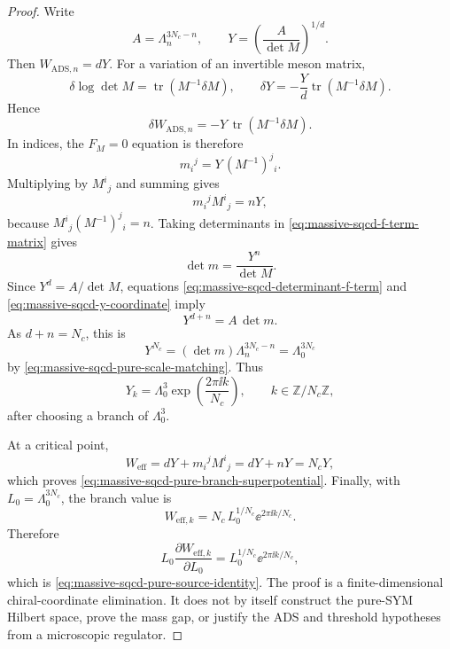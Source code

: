 \begin{proof}
Write
\begin{equation}
  A=\Lambda_n^{3N_c-n},
  \qquad
  Y=\left(\frac{A}{\det M}\right)^{1/d}.
  \label{eq:massive-sqcd-y-coordinate}
\end{equation}
Then \(W_{\mathrm{ADS},n}=dY\).  For a variation of an invertible meson
matrix,
\[
  \delta\log\det M=\operatorname{tr}(M^{-1}\delta M),
  \qquad
  \delta Y
  =
  -\frac{Y}{d}\operatorname{tr}(M^{-1}\delta M).
\]
Hence
\[
  \delta W_{\mathrm{ADS},n}
  =
  -Y\,\operatorname{tr}(M^{-1}\delta M).
\]
In indices, the \(F_M=0\) equation is therefore
\begin{equation}
  m_i{}^j=Y\,(M^{-1})^j{}_i .
  \label{eq:massive-sqcd-f-term-matrix}
\end{equation}
Multiplying by \(M^i{}_j\) and summing gives
\begin{equation}
  m_i{}^jM^i{}_j=nY,
  \label{eq:massive-sqcd-trace-mass-meson}
\end{equation}
because \(M^i{}_j(M^{-1})^j{}_i=n\).  Taking determinants in
\eqref{eq:massive-sqcd-f-term-matrix} gives
\begin{equation}
  \det m=\frac{Y^n}{\det M}.
  \label{eq:massive-sqcd-determinant-f-term}
\end{equation}
Since \(Y^d=A/\det M\), equations
\eqref{eq:massive-sqcd-determinant-f-term} and
\eqref{eq:massive-sqcd-y-coordinate} imply
\[
  Y^{d+n}=A\,\det m.
\]
As \(d+n=N_c\), this is
\[
  Y^{N_c}
  =
  (\det m)\Lambda_n^{3N_c-n}
  =
  \Lambda_0^{3N_c}
\]
by \eqref{eq:massive-sqcd-pure-scale-matching}.  Thus
\[
  Y_k=\Lambda_0^3\exp\!\left(\frac{2\pi\ii k}{N_c}\right),
  \qquad k\in\mathbb Z/N_c\mathbb Z,
\]
after choosing a branch of \(\Lambda_0^3\).

At a critical point,
\[
  W_{\mathrm{eff}}
  =
  dY+m_i{}^jM^i{}_j
  =
  dY+nY
  =
  N_cY,
\]
which proves \eqref{eq:massive-sqcd-pure-branch-superpotential}.  Finally,
with \(L_0=\Lambda_0^{3N_c}\), the branch value is
\[
  W_{\mathrm{eff},k}=N_c\,L_0^{1/N_c}\ee^{2\pi\ii k/N_c}.
\]
Therefore
\[
  L_0\frac{\partial W_{\mathrm{eff},k}}{\partial L_0}
  =
  L_0^{1/N_c}\ee^{2\pi\ii k/N_c},
\]
which is \eqref{eq:massive-sqcd-pure-source-identity}.  The proof is a
finite-dimensional chiral-coordinate elimination.  It does not by itself
construct the pure-SYM Hilbert space, prove the mass gap, or justify the ADS
and threshold hypotheses from a microscopic regulator.
\end{proof}

